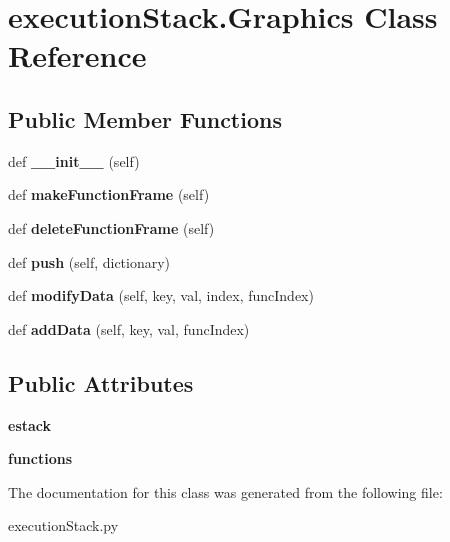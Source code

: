 \hypertarget{classexecution_stack_1_1_graphics}{}\section{execution\+Stack.\+Graphics Class Reference}
\label{classexecution_stack_1_1_graphics}
\subsection*{Public Member Functions}
\begin{DoxyCompactItemize}
\item 
def {\bfseries \+\_\+\+\_\+init\+\_\+\+\_\+} (self)\hypertarget{classexecution_stack_1_1_graphics_acf9ace0155ce0c9f9865ed83ad834ece}{}\label{classexecution_stack_1_1_graphics_acf9ace0155ce0c9f9865ed83ad834ece}

\item 
def {\bfseries make\+Function\+Frame} (self)\hypertarget{classexecution_stack_1_1_graphics_ae2d3817297524a7f62cdb500501bd33f}{}\label{classexecution_stack_1_1_graphics_ae2d3817297524a7f62cdb500501bd33f}

\item 
def {\bfseries delete\+Function\+Frame} (self)\hypertarget{classexecution_stack_1_1_graphics_a8da37c457e222b7f131f4c25acd08c56}{}\label{classexecution_stack_1_1_graphics_a8da37c457e222b7f131f4c25acd08c56}

\item 
def {\bfseries push} (self, dictionary)\hypertarget{classexecution_stack_1_1_graphics_a455991c3f35dc6c47973a8183f3a06e4}{}\label{classexecution_stack_1_1_graphics_a455991c3f35dc6c47973a8183f3a06e4}

\item 
def {\bfseries modify\+Data} (self, key, val, index, func\+Index)\hypertarget{classexecution_stack_1_1_graphics_a5b793f6f5577abbfdec7b202875db391}{}\label{classexecution_stack_1_1_graphics_a5b793f6f5577abbfdec7b202875db391}

\item 
def {\bfseries add\+Data} (self, key, val, func\+Index)\hypertarget{classexecution_stack_1_1_graphics_a02a8347895b7cbb48506e29dfd12f56a}{}\label{classexecution_stack_1_1_graphics_a02a8347895b7cbb48506e29dfd12f56a}

\end{DoxyCompactItemize}
\subsection*{Public Attributes}
\begin{DoxyCompactItemize}
\item 
{\bfseries estack}\hypertarget{classexecution_stack_1_1_graphics_a8cb32cead44e14bef2b68ce5d5b4a775}{}\label{classexecution_stack_1_1_graphics_a8cb32cead44e14bef2b68ce5d5b4a775}

\item 
{\bfseries functions}\hypertarget{classexecution_stack_1_1_graphics_a7390c53c977fb6f992bbd59d106a014d}{}\label{classexecution_stack_1_1_graphics_a7390c53c977fb6f992bbd59d106a014d}

\end{DoxyCompactItemize}


The documentation for this class was generated from the following file\+:\begin{DoxyCompactItemize}
\item 
execution\+Stack.\+py\end{DoxyCompactItemize}
